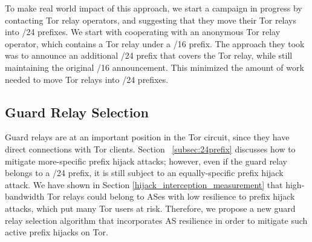 To make real world impact of this approach, we start a campaign in progress by contacting Tor relay operators, and suggesting that they move their Tor relays into /24 prefixes. We start with cooperating with an anonymous Tor relay operator, which contains a Tor relay under a /16 prefix. The approach they took was to announce an additional /24 prefix that covers the Tor relay, while still maintaining the original /16 announcement. This minimized the amount of work needed to move Tor relays into /24 prefixes. 

\subsection{Guard Relay Selection}
\label{subsec:relayselection}

Guard relays are at an important position in the Tor circuit, since they have direct connections with Tor clients. Section ~\ref{subsec:24prefix} discusses how to mitigate more-specific prefix hijack attacks; however, even if the guard relay belongs to a /24 prefix, it is still subject to an equally-specific prefix hijack attack. We have shown in Section \ref{hijack_interception_measurement} that high-bandwidth Tor relays could belong to ASes with low resilience to prefix hijack attacks, which put many Tor users at risk. Therefore, we propose a new guard relay selection algorithm that incorporates AS resilience in order to mitigate such active prefix hijacks on Tor.


